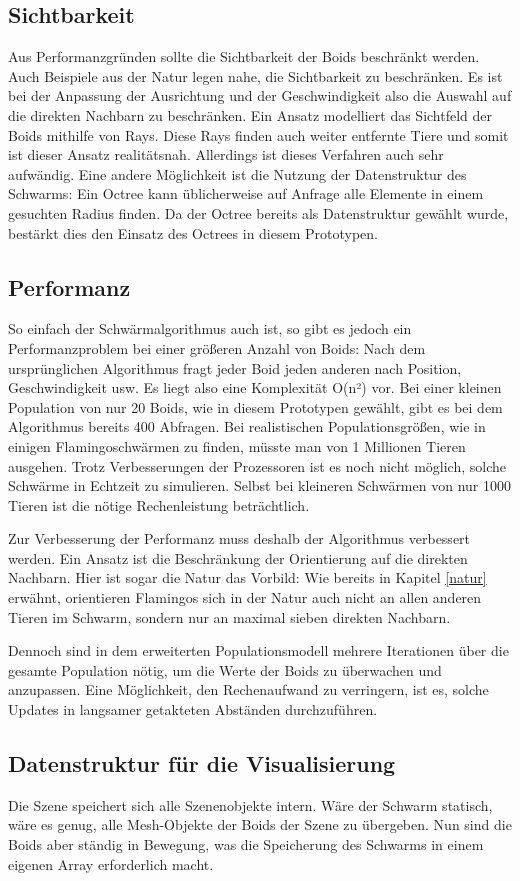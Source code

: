 \documentclass[draft=false
              ,paper=a4
              ,twoside=false
              ,fontsize=11pt
              ,headsepline
              ,BCOR10mm
              ,DIV11
              ,bibtotoc
              ,liststotoc
              ]{scrbook}
\begin{document}
\subsection{Sichtbarkeit}
Aus Performanzgründen sollte die Sichtbarkeit der Boids beschränkt werden. Auch Beispiele aus der Natur legen nahe, die Sichtbarkeit zu beschränken. Es ist bei der Anpassung der Ausrichtung und der Geschwindigkeit also die Auswahl auf die direkten Nachbarn zu beschränken. Ein Ansatz modelliert das Sichtfeld der Boids mithilfe von Rays. Diese Rays finden auch weiter entfernte Tiere und somit ist dieser Ansatz realitätsnah. Allerdings ist dieses Verfahren auch sehr aufwändig. Eine andere Möglichkeit ist die Nutzung der Datenstruktur des Schwarms: Ein Octree kann üblicherweise auf Anfrage alle Elemente in einem gesuchten Radius finden. Da der Octree bereits als Datenstruktur gewählt wurde, bestärkt dies den Einsatz des Octrees in diesem Prototypen.
\subsection{Performanz}
So einfach der Schwärmalgorithmus auch ist, so gibt es jedoch ein Performanzproblem bei einer größeren Anzahl von Boids: Nach dem ursprünglichen Algorithmus fragt jeder Boid jeden anderen nach Position, Geschwindigkeit usw. Es liegt also eine Komplexität O(n²) vor. Bei einer kleinen Population von nur 20 Boids, wie in diesem Prototypen gewählt, gibt es bei dem Algorithmus bereits 400 Abfragen. Bei realistischen Populationsgrößen, wie in einigen Flamingoschwärmen zu finden, müsste man von 1 Millionen Tieren ausgehen. Trotz Verbesserungen der Prozessoren ist es noch nicht möglich, solche Schwärme in Echtzeit zu simulieren. Selbst bei kleineren Schwärmen von nur 1000 Tieren ist die nötige Rechenleistung beträchtlich.

Zur Verbesserung der Performanz muss deshalb der Algorithmus verbessert werden. Ein Ansatz ist die Beschränkung der Orientierung auf die direkten Nachbarn. Hier ist sogar die Natur das Vorbild: Wie bereits in Kapitel \ref{natur} erwähnt, orientieren Flamingos sich in der Natur auch nicht an allen anderen Tieren im Schwarm, sondern nur an maximal sieben direkten Nachbarn.

Dennoch sind in dem erweiterten Populationsmodell mehrere Iterationen über die gesamte Population nötig, um die Werte der Boids zu überwachen und anzupassen. Eine Möglichkeit, den Rechenaufwand zu verringern, ist es, solche Updates in langsamer getakteten Abständen durchzuführen.
\subsection{Datenstruktur für die Visualisierung}\label{visualstruktur}
Die Szene speichert sich alle Szenenobjekte intern. Wäre der Schwarm statisch, wäre es genug, alle Mesh-Objekte der Boids der Szene zu übergeben. Nun sind die Boids aber ständig in Bewegung, was die Speicherung des Schwarms in einem eigenen Array erforderlich macht.
\end{document}
